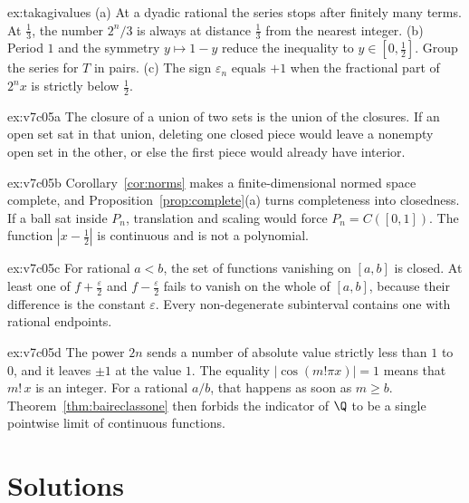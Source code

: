 \begin{hint}{ex:takagivalues}
(a) At a dyadic rational the series stops after finitely many terms. At $\frac13$, the number $2^n/3$ is always at distance $\frac13$ from the nearest integer. (b) Period $1$ and the symmetry $y\mapsto1-y$ reduce the inequality to $y\in[0,\frac12]$. Group the series for $T$ in pairs. (c) The sign $\varepsilon_n$ equals $+1$ when the fractional part of $2^nx$ is strictly below $\frac12$.
\end{hint}

\begin{hint}{ex:v7c05a}
The closure of a union of two sets is the union of the closures. If an open set sat in that union, deleting one closed piece would leave a nonempty open set in the other, or else the first piece would already have interior.
\end{hint}
\begin{hint}{ex:v7c05b}
Corollary~\ref{cor:norms} makes a finite-dimensional normed space complete, and Proposition~\ref{prop:complete}(a) turns completeness into closedness. If a ball sat inside $P_n$, translation and scaling would force $P_n=C([0,1])$. The function $|x-\frac12|$ is continuous and is not a polynomial.
\end{hint}
\begin{hint}{ex:v7c05c}
For rational $a<b$, the set of functions vanishing on $[a,b]$ is closed. At least one of $f+\frac\varepsilon2$ and $f-\frac\varepsilon2$ fails to vanish on the whole of $[a,b]$, because their difference is the constant $\varepsilon$. Every non-degenerate subinterval contains one with rational endpoints.
\end{hint}
\begin{hint}{ex:v7c05d}
The power $2n$ sends a number of absolute value strictly less than $1$ to $0$, and it leaves $\pm1$ at the value $1$. The equality $|\cos(m!\pi x)|=1$ means that $m!\,x$ is an integer. For a rational $a/b$, that happens as soon as $m\ge b$. Theorem~\ref{thm:baireclassone} then forbids the indicator of $\Q$ to be a single pointwise limit of continuous functions.
\end{hint}

\section{Solutions}

